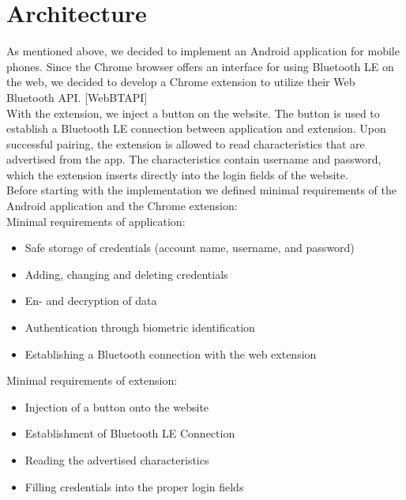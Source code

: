 \section{Architecture}
\label{architecture}

As mentioned above, we decided to implement an Android application for mobile phones. Since the Chrome browser offers an interface for using Bluetooth LE on the web, we decided to develop a Chrome extension to utilize their Web Bluetooth API. [WebBTAPI] \\

With the extension, we inject a button on the website. The button is used to establish a Bluetooth LE connection between application and extension. Upon successful pairing, the extension is allowed to read characteristics that are advertised from the app. The characteristics contain username and password, which the extension inserts directly into the login fields of the website. \\

\noindent Before starting with the implementation we defined minimal requirements of the Android application and the Chrome extension: \\

\noindent Minimal requirements of application:
\begin{itemize}
\item Safe storage of credentials (account name, username, and password)
\item Adding, changing and deleting credentials
\item En- and decryption of data 
\item Authentication through biometric identification
\item Establishing a Bluetooth connection with the web extension
\end{itemize}
\vspace{0.3cm}
\noindent Minimal requirements of extension:
\begin{itemize}
\item Injection of a button onto the website
\item Establishment of Bluetooth LE Connection
\item Reading the advertised characteristics
\item Filling credentials into the proper login fields
\end{itemize}


